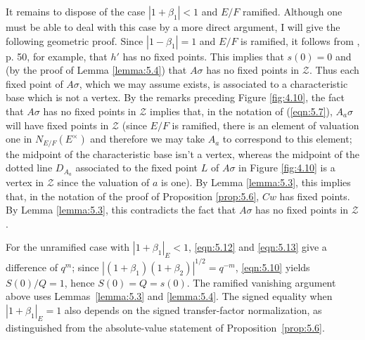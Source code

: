 \documentclass[12pt,letterpaper]{amsart}
\numberwithin{equation}{section}
\theoremstyle{definition}
\theoremstyle{plain}
\providecommand{\cal}{\mathcal}
\def\zz{{\cal Z}}
\begin{document}
It remains to dispose of the case $|1+\beta_1|<1$ and $E/F$ ramified.
Although one must be able to deal with this case by a more direct argument,
I will give the following geometric proof. 
Since $|1-\beta_1|=1$ and $E/F$ is ramified, 
it follows from \cite{La80b}, p. 50,
for example, that $h'$ has no fixed points. 
This implies that $s(0)=0$ and
(by the proof of Lemma \ref{lemma:5.4}) that
$A\sigma$ has no fixed points in $\zz$. 
Thus each fixed point of $A\sigma$, which we may 
assume exists, is associated to a
characteristic base which is not a vertex.
By the remarks preceding Figure \ref{fig:4.10}, the fact that
$A\sigma$ has no fixed points in $\zz$ implies
that, in the notation of (\ref{eqn:5.7}),
$A_a\sigma$ will have fixed points in $\zz$ (since $E/F$ is ramified,
there is an element of valuation one in $N_{E/F}(E^\times )$
and therefore we may take $A_a$ to correspond to this element; the midpoint
of the characteristic base isn't a vertex,
whereas the midpoint of the dotted line $D_{A_a}$ associated to the fixed
point $L$ of $A\sigma$ in Figure \ref{fig:4.10} is a vertex in $\zz$
since the valuation of $a$ is one). By Lemma \ref{lemma:5.3}, 
this implies that,
in the notation of the proof of Proposition \ref{prop:5.6},
$Cw$ has fixed points. By Lemma \ref{lemma:5.3},
this contradicts the fact that $A\sigma$ has no fixed points in $\zz$.
 
For the unramified case with $|1+\beta_1|_E<1$,
\eqref{eqn:5.12} and \eqref{eqn:5.13} give a difference of $q^m$;
since $|(1+\beta_1)(1+\beta_2)|^{1/2}=q^{-m}$,
\eqref{eqn:5.10} yields $S(0)/Q=1$, hence $S(0)=Q=s(0)$.
The ramified vanishing argument above uses Lemmas~\ref{lemma:5.3}
and \ref{lemma:5.4}. The signed equality when
$|1+\beta_1|_E=1$ also depends on the signed transfer-factor
normalization, as distinguished from the absolute-value statement of
Proposition~\ref{prop:5.6}.
\end{document}
